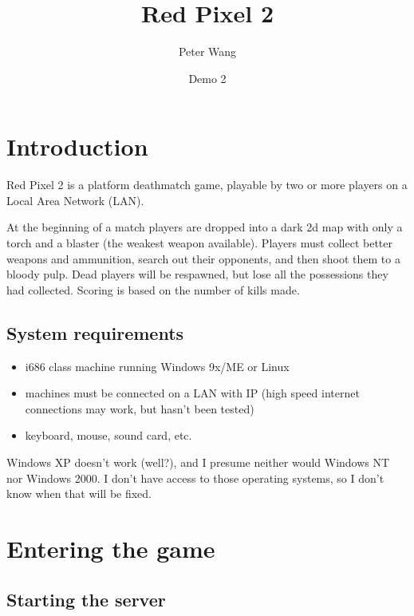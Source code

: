 \documentclass[a4paper,titlepage]{article}
\begin{document}
\newcommand{\key}[1]{\fbox{\texttt{#1}}}


\title{Red Pixel 2}
\date{Demo 2}
\author{Peter Wang}
\maketitle

\tableofcontents
\newpage


\section{Introduction}

Red Pixel 2 is a platform deathmatch game, playable by two or more
players on a Local Area Network (LAN).

At the beginning of a match players are dropped into a dark 2d map
with only a torch and a blaster (the weakest weapon available).
Players must collect better weapons and ammunition, search out their
opponents, and then shoot them to a bloody pulp.  Dead players will be
respawned, but lose all the possessions they had collected.  Scoring
is based on the number of kills made.


\subsection{System requirements}

\begin{itemize}
\item i686 class machine running Windows 9x/ME or Linux
\item machines must be connected on a LAN with IP (high speed internet
  connections may work, but hasn't been tested)
\item keyboard, mouse, sound card, etc.
\end{itemize}

Windows XP doesn't work (well?), and I presume neither would Windows
NT nor Windows 2000.  I don't have access to those operating systems,
so I don't know when that will be fixed.



\section{Entering the game}


\subsection{Starting the server}
\end{document}
